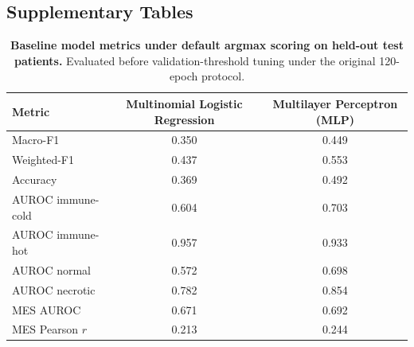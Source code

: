 \documentclass[11pt,letterpaper]{article}
\begin{document}
\clearpage
\subsection*{Supplementary Tables}

\begin{table}[H]
\centering
\caption{\textbf{Baseline model metrics under default argmax scoring on held-out test patients.} Evaluated before validation-threshold tuning under the original 120-epoch protocol.}
\label{tab:s1}
\small
\begin{tabular}{lcc}
\toprule
\textbf{Metric} & \textbf{Multinomial Logistic Regression} & \textbf{Multilayer Perceptron (MLP)} \\
\midrule
Macro-F1          & 0.350 & 0.449 \\
Weighted-F1       & 0.437 & 0.553 \\
Accuracy          & 0.369 & 0.492 \\
AUROC immune-cold & 0.604 & 0.703 \\
AUROC immune-hot  & 0.957 & 0.933 \\
AUROC normal      & 0.572 & 0.698 \\
AUROC necrotic    & 0.782 & 0.854 \\
MES AUROC         & 0.671 & 0.692 \\
MES Pearson $r$   & 0.213 & 0.244 \\
\bottomrule
\end{tabular}
\end{table}

\vspace{1em}
\end{document}
